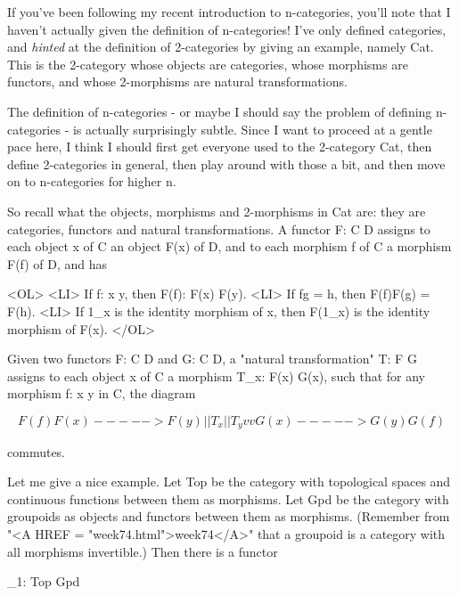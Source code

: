 


If you've been following my recent introduction to n-categories, you'll
note that I haven't actually given the definition of n-categories!  I've
only defined categories, and \emph{hinted} at the definition of 2-categories
by giving an example, namely Cat.  This is the 2-category whose objects
are categories, whose morphisms are functors, and whose 2-morphisms are
natural transformations.

The definition of n-categories - or maybe I should say the problem of
defining n-categories - is actually surprisingly subtle.  Since I want
to proceed at a gentle pace here, I think I should first get everyone
used to the 2-category Cat, then define 2-categories in general, then
play around with those a bit, and then move on to n-categories for
higher n.  

So recall what the objects, morphisms and 2-morphisms in Cat are: they
are categories, functors and natural transformations.  A functor F: C \to 
D assigns to each object x of C an object F(x) of D, and to each morphism
f of C a morphism F(f) of D, and has 

<OL>
<LI>
If f: x \to  y, then F(f): F(x) \to  F(y).
<LI>
If fg = h, then F(f)F(g) = F(h). 
<LI>
If 1_{x} is the identity morphism of x, then F(1_{x}) 
is the identity  morphism of F(x). 
</OL>

Given two functors F: C \to  D and G: C \to  D, a "natural
transformation" T: F \to  G assigns to each object x of C a
morphism T_{x}: F(x) \to  G(x), such that for any morphism f: x
\to  y in C, the diagram


$$

                               F(f)
                         F(x) -----> F(y)
 _{ }                        |           |
                        T_{x}|           |T_{y}
                          v           v
                         G(x) -----> G(y)
                               G(f)

$$
    
commutes.  

Let me give a nice example.  Let Top be the category with topological
spaces and continuous functions between them as morphisms.  Let Gpd be
the category with groupoids as objects and functors between them as
morphisms.  (Remember from "<A HREF = "week74.html">week74</A>" that a groupoid is a category with
all morphisms invertible.)  Then there is a functor

                      \Pi _{1}: Top \to  Gpd

